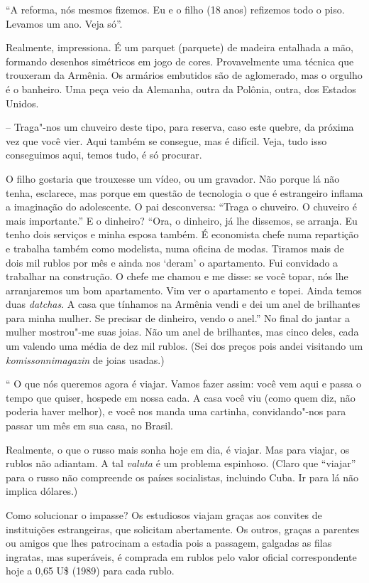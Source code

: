 ``A reforma, nós mesmos fizemos. Eu e o filho (18 anos) refizemos todo o
piso. Levamos um ano. Veja só''.

Realmente, impressiona. É um parquet (parquete) de madeira entalhada a
mão, formando desenhos simétricos em jogo de cores. Provavelmente uma
técnica que trouxeram da Armênia. Os armários embutidos são de
aglomerado, mas o orgulho é o banheiro. Uma peça veio da Alemanha, outra
da Polônia, outra, dos Estados Unidos.

-- Traga"-nos um chuveiro deste tipo, para reserva, caso este quebre, da
próxima vez que você vier. Aqui também se consegue, mas é difícil. Veja,
tudo isso conseguimos aqui, temos tudo, é só procurar.

O filho gostaria que trouxesse um vídeo, ou um gravador. Não porque lá
não tenha, esclarece, mas porque em questão de tecnologia o que é
estrangeiro inflama a imaginação do adolescente. O pai desconversa:
``Traga o chuveiro. O chuveiro é mais importante.'' E o dinheiro? ``Ora,
o dinheiro, já lhe dissemos, se arranja. Eu tenho dois serviços e minha
esposa também. É economista chefe numa repartição e trabalha também como
modelista, numa oficina de modas. Tiramos mais de dois mil rublos por
mês e ainda nos `deram' o apartamento. Fui convidado a trabalhar na
construção. O chefe me chamou e me disse: se você topar, nós lhe
arranjaremos um bom apartamento. Vim ver o apartamento e topei. Ainda
temos duas \emph{datchas}. A casa que tínhamos na Armênia vendi e dei um
anel de brilhantes para minha mulher. Se precisar de dinheiro, vendo o
anel.'' No final do jantar a mulher mostrou"-me suas joias. Não um anel
de brilhantes, mas cinco deles, cada um valendo uma média de dez mil
rublos. (Sei dos preços pois andei visitando um \emph{komissonnimagazin}
de joias usadas.)

`` O que nós queremos agora é viajar. Vamos fazer assim: você vem aqui e
passa o tempo que quiser, hospede em nossa cada. A casa você viu (como
quem diz, não poderia haver melhor), e você nos manda uma cartinha,
convidando"-nos para passar um mês em sua casa, no Brasil.

Realmente, o que o russo mais sonha hoje em dia, é viajar. Mas para
viajar, os rublos não adiantam. A tal \emph{valuta} é um problema
espinhoso. (Claro que ``viajar'' para o russo não compreende os países
socialistas, incluindo Cuba. Ir para lá não implica dólares.)

Como solucionar o impasse? Os estudiosos viajam graças aos convites de
instituições estrangeiras, que solicitam abertamente. Os outros, graças
a parentes ou amigos que lhes patrocinam a estadia pois a passagem,
galgadas as filas ingratas, mas superáveis, é comprada em rublos pelo
valor oficial correspondente hoje a 0,65 U\$ (1989) para cada rublo.

